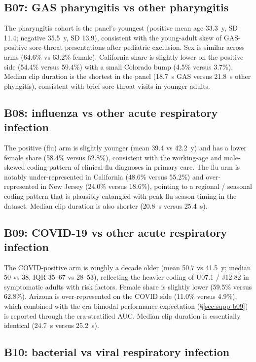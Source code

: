 \documentclass[utf8]{frontiers_suppmat} %
\begin{document}
\subsection{B07: GAS pharyngitis vs other pharyngitis}

The pharyngitis cohort is the panel's youngest (positive mean age
33.3~y, SD 11.4; negative 35.5~y, SD 13.9), consistent with the
young-adult skew of GAS-positive sore-throat presentations after
pediatric exclusion. Sex is similar across arms (64.6\% vs 63.2\%
female). California share is slightly lower on the positive side
(54.4\% versus 59.4\%) with a small Colorado bump (4.5\% versus
3.7\%). Median clip duration is the shortest in the panel (18.7~s
GAS versus 21.8~s other phyngitis), consistent with brief
sore-throat visits in younger adults.

\subsection{B08: influenza vs other acute respiratory infection}

The positive (flu) arm is slightly younger (mean 39.4 vs 42.2~y)
and has a lower female share (58.4\% versus 62.8\%), consistent
with the working-age and male-skewed coding pattern of clinical-flu
diagnoses in primary care. The flu arm is notably under-represented
in California (48.6\% versus 55.2\%) and over-represented in
New Jersey (24.0\% versus 18.6\%), pointing to a regional / seasonal
coding pattern that is plausibly entangled with peak-flu-season
timing in the dataset. Median clip duration is also shorter (20.8~s
versus 25.4~s).

\subsection{B09: COVID-19 vs other acute respiratory infection}

The COVID-positive arm is roughly a decade older (mean 50.7 vs
41.5~y; median 50 vs 38, IQR 35--67 vs 28--53), reflecting the
heavier coding of U07.1 / J12.82 in symptomatic adults with risk
factors. Female share is slightly lower (59.5\% versus 62.8\%).
Arizona is over-represented on the COVID side (11.0\% versus 4.9\%),
which combined with the era-bimodal performance expectation
(\S\ref{sec:supp-b09}) is reported through the era-stratified
AUC. Median clip duration is essentially identical (24.7~s versus
25.2~s).

\subsection{B10: bacterial vs viral respiratory infection}
\end{document}

